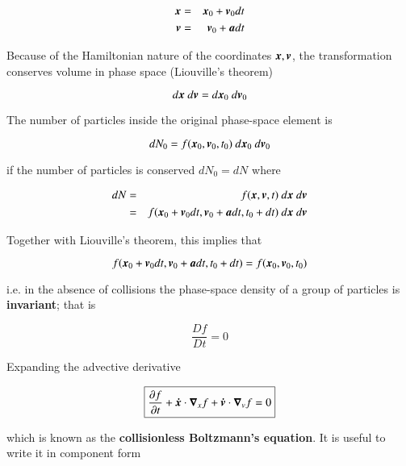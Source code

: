 \begin{eqnarray}
{\boldsymbol{x}} &=& {\boldsymbol{x}}_0 + {\boldsymbol{v}}_0 dt \\
{\boldsymbol{v}} &=& {\boldsymbol{v}}_0 + {\boldsymbol{a}} dt 
\end{eqnarray}

\noindent Because of the Hamiltonian nature of the coordinates ${\boldsymbol{x}},{\boldsymbol{v}}$, the transformation conserves volume in phase space (Liouville's theorem)

\begin{equation}
d\v{x} \ d\v{v} = d\v{x}_0 \ d\v{v}_0
\end{equation}

\noindent The number of particles inside the original phase-space element is

\begin{equation}
dN_0 =f(\v{x}_0,\v{v}_0,t_0)\ d\v{x}_0 \ d\v{v}_0 
\end{equation}

\noindent if the number of particles is conserved $dN_0 = dN$ where

\begin{eqnarray}
dN &=& f(\v{x},\v{v},t) \ d\v{x} \ d\v{v} \\
&=& f(\v{x}_0 +\v{v}_0 dt,\v{v}_0 +\v{a}dt,t_0 +dt)\ d\v{x} \ d\v{v}
\end{eqnarray}


\noindent Together with Liouville's theorem, this implies that

\begin{equation}
f({\boldsymbol{x}}_0 + {\boldsymbol{v}}_0dt,{\boldsymbol{v}}_0 +{\boldsymbol{a}}dt,t_0 + dt)=f({\boldsymbol{x}}_0,{\boldsymbol{v}}_0,t_0)
\end{equation}


\noindent i.e. in the absence of collisions the phase-space density of a group
of particles is {\bf invariant}; that is


\begin{equation}
\frac{Df}{Dt} = 0 
\end{equation}


\noindent Expanding the advective derivative

\begin{equation}
\boxed{
\frac{\partial f}{\partial t} + {\boldsymbol{\dot{x}}}\cdot{\boldsymbol{\nabla}}_x f + {\boldsymbol{\dot{v}}}\cdot{\boldsymbol{\nabla}}_v f = 0 
}
\end{equation}

\noindent which is known as the {\bf collisionless Boltzmann's
  equation}. It is useful to write it in component form  %



